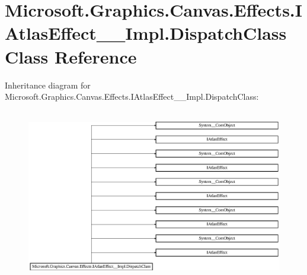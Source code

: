 \hypertarget{class_microsoft_1_1_graphics_1_1_canvas_1_1_effects_1_1_i_atlas_effect_____impl_1_1_dispatch_class}{}\section{Microsoft.\+Graphics.\+Canvas.\+Effects.\+I\+Atlas\+Effect\+\_\+\+\_\+\+Impl.\+Dispatch\+Class Class Reference}
\label{class_microsoft_1_1_graphics_1_1_canvas_1_1_effects_1_1_i_atlas_effect_____impl_1_1_dispatch_class}
Inheritance diagram for Microsoft.\+Graphics.\+Canvas.\+Effects.\+I\+Atlas\+Effect\+\_\+\+\_\+\+Impl.\+Dispatch\+Class\+:\begin{figure}[H]
\begin{center}
\leavevmode
\includegraphics[height=7.586207cm]{class_microsoft_1_1_graphics_1_1_canvas_1_1_effects_1_1_i_atlas_effect_____impl_1_1_dispatch_class}
\end{center}
\end{figure}
